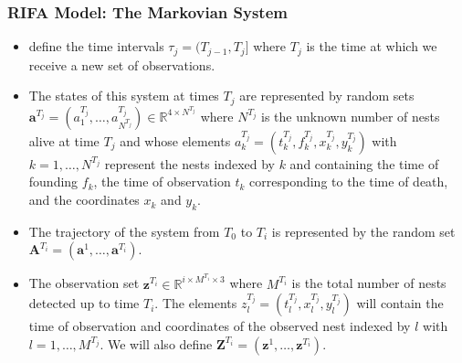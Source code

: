 \documentclass[9pt, xcolor={dvipsnames,svgnames,table}]{beamer}
\begin{document}
\begin{frame}
    \frametitle{RIFA Model: The Markovian System}
    \begin{itemize}
        \item define the \textcolor{PineGreen}{time intervals} $\tau_j = (T_{j-1}, T_j]$ where $T_j$ is the time at which we receive a new set of observations.
        \item \textcolor{PineGreen}{The states of this system} at times $T_j$ are represented by random sets $\bm{a}^{T_j} = (a^{T_j}_1, \dots, a^{T_j}_{N^{T_j}}) \in \mathbb{R}^{4\times N^{T_j}}$ where $N^{T_j}$ is the unknown number of nests alive at time $T_j$ and whose elements $a^{T_j}_k = (t_k^{T_j}, f_k^{T_j}, x_k^{T_j}, y_k^{T_j})$ with $k = 1, \dots , N^{T_j}$ represent the nests indexed by $k$ and containing \textcolor{PineGreen}{the time of founding $f_k$, the time of observation $t_k$ corresponding to the time of death, and the coordinates $x_k$ and $y_k$}.
        \item \textcolor{PineGreen}{The trajectory of the system} from $T_0$ to $T_i$ is represented by the random set $\bm{A}^{T_i} = (\bm{a}^1, \dots, \bm{a}^{T_i})$.
        \item \textcolor{PineGreen}{The observation set} $\bm{z}^{T_i} \in \mathbb{R}^{i \times M^{T_i} \times 3}$ where $M^{T_i}$ is the total number of nests detected up to time $T_i$. The elements $z^{T_j}_l = (t^{T_j}_l, x^{T_j}_l, y^{T_j}_l)$ will contain the time of observation and coordinates of the observed nest indexed by $l$ with $l = 1, \dots, M^{T_j}$. We will also define $\bm{Z}^{T_i} = (\bm{z}^1, \dots, \bm{z}^{T_i})$.
    \end{itemize}
\end{frame}
\end{document}
